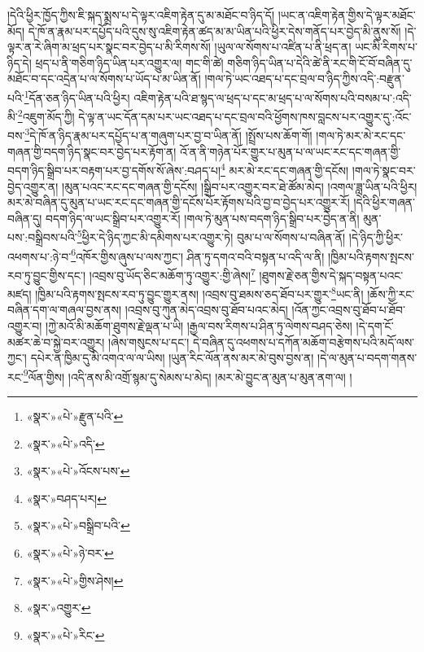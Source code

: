 །དེའི་ཕྱིར་ཁྱོད་ཀྱིས་ཇི་སྐད་སྨྲས་པ་དེ་ལྟར་འཇིག་རྟེན་དུ་མ་མཐོང་བ་ཉིད་དོ། །ཡང་ན་འཇིག་རྟེན་གྱིས་དེ་ལྟར་མཐོང་མོད། དེ་ཁོ་ན་རྣམ་པར་དཔྱོད་པའི་དུས་སུ་འཇིག་རྟེན་ཚད་མ་མ་ཡིན་པའི་ཕྱིར་དེས་གནོད་པར་བྱེད་མི་ནུས་སོ། །དེ་ལྟར་ན་རེ་ཞིག་མ་ཕྲད་པར་སྣང་བར་བྱེད་པ་མི་རིགས་སོ། །ཡུལ་ལ་སོགས་པ་འཛིན་པ་ནི་ཕྲད་ན། ཡང་མི་རིགས་པ་ཉིད་དེ། ཕྲད་པ་ནི་གཅིག་ཉིད་ཡིན་པར་འགྱུར་ལ། གང་གི་ཚེ། གཅིག་ཉིད་ཡིན་པ་དེའི་ཚེ་ནི་རང་གི་ངོ་བོ་བཞིན་དུ་མཐོང་བ་དང་འདྲེན་པ་ལ་སོགས་པ་ཡོད་པ་མ་ཡིན་ནོ། །གལ་ཏེ་ཡང་འཐད་པ་དང་བྲལ་བ་ཉིད་ཀྱིས་འདི་:བརྫུན་པའི་\footnote{«སྣར་»«པེ་»རྫུན་པའི་}དོན་ཅན་ཉིད་ཡིན་པའི་ཕྱིར། འཇིག་རྟེན་པའི་ཐ་སྙད་ལ་ཕྲད་པ་དང་མ་ཕྲད་པ་ལ་སོགས་པའི་བསམ་པ་:འདི་མི་\footnote{«སྣར་»«པེ་»འདི་}འཇུག་མོད་ཀྱི། དེ་ལྟ་ན་ཡང་དོན་དམ་པར་ཡང་འཐད་པ་དང་བྲལ་བའི་ཕྱོགས་ཁས་བླངས་པར་འགྱུར་དུ་:འོང་བས་\footnote{«སྣར་»«པེ་»འོངས་པས་}དེ་ཁོ་ན་ཉིད་རྣམ་པར་དཔྱོད་པ་ན་གཞུག་པར་བྱ་བ་ཡིན་ནོ། །སྤྲོས་པས་ཆོག་གོ། །གལ་ཏེ་མར་མེ་རང་དང་གཞན་གྱི་བདག་ཉིད་སྣང་བར་བྱེད་པར་རྟོག་ན། འོ་ན་ནི་གཉེན་པོར་གྱུར་པ་མུན་པ་ལ་ཡང་རང་དང་གཞན་གྱི་བདག་ཉིད་སྒྲིབ་པར་བརྟག་པར་བྱ་དགོས་སོ་ཞེས་:བཤད་པ།\footnote{«སྣར་»བཤད་པར།} མར་མེ་རང་དང་གཞན་གྱི་དངོས། །གལ་ཏེ་སྣང་བར་བྱེད་འགྱུར་ན། །མུན་པའང་རང་དང་གཞན་གྱི་དངོས། །སྒྲིབ་པར་འགྱུར་བར་ཐེ་ཚོམ་མེད། །འགལ་ཟླ་ཡིན་པའི་ཕྱིར། མར་མེ་བཞིན་དུ་མུན་པ་ཡང་རང་དང་གཞན་གྱི་དངོས་པོར་རྟོགས་པའི་བྱ་བ་བྱེད་པར་འགྱུར་རོ། །དེའི་ཕྱིར་གཞན་བཞིན་དུ། བདག་ཉིད་ལ་ཡང་སྒྲིབ་པར་འགྱུར་རོ། །གལ་ཏེ་མུན་པས་བདག་ཉིད་སྒྲིབ་པར་བྱེད་ན་ནི། མུན་པས་:བསྒྲིབས་པའི་\footnote{«སྣར་»«པེ་»བསྒྲིབ་པའི་}ཕྱིར་དེ་ཉིད་ཀྱང་མི་དམིགས་པར་འགྱུར་ཏེ། བུམ་པ་ལ་སོགས་པ་བཞིན་ནོ། །དེ་ཉིད་ཀྱི་ཕྱིར་འཕགས་པ་:ཉེ་བ་\footnote{«སྣར་»«པེ་»ཉེ་བར་}འཁོར་གྱིས་ཞུས་པ་ལས་ཀྱང་། ཤིན་ཏུ་དགའ་བའི་བསྟན་པ་འདི་ལ་ནི། །ཁྱིམ་པའི་རྟགས་སྤངས་རབ་ཏུ་བྱུང་གྱིས་དང་། །འབྲས་བུ་ཡོད་ཅིང་མཆོག་ཏུ་འགྱུར་:གྱི་ཞེས།\footnote{«སྣར་»«པེ་»གྱིས་ཤེས།} །ཐུགས་རྗེ་ཅན་གྱིས་དེ་སྐད་བསྟན་པའང་མཛད། །ཁྱིམ་པའི་རྟགས་སྤངས་རབ་ཏུ་བྱུང་གྱུར་ནས། །འབྲས་བུ་ཐམས་ཅད་ཐོབ་པར་གྱུར་\footnote{«སྣར་»འགྱུར་}ཡང་ནི། །ཆོས་ཀྱི་རང་བཞིན་དག་ལ་གཞལ་བྱས་ནས། །འབྲས་བུ་ཀུན་མེད་འབྲས་བུ་ཐོབ་པའང་མེད། །འོན་ཀྱང་འབྲས་བུ་ཐོབ་པ་ཐོབ་འགྱུར་བ། །ཀྱེ་མའོ་མི་མཆོག་ཐུགས་རྗེ་ལྡན་པ་ཡི། །རྒྱལ་བས་རིགས་པ་ཤིན་ཏུ་ལེགས་བཤད་ཅེས། །དེ་དག་ངོ་མཚར་ཆེ་བ་སྐྱེ་བར་འགྱུར། །ཞེས་གསུངས་པ་དང་། དེ་བཞིན་དུ་འཕགས་པ་དཀོན་མཆོག་བརྩེགས་པའི་མདོ་ལས་ཀྱང་། དཔེར་ན་ཁྱིམ་དུ་མི་འགའ་ལ་ལ་ཡིས། །ཡུན་རིང་ལོན་ནས་མར་མེ་བུས་བྱས་ན། །དེ་ལ་མུན་པ་བདག་གནས་རང་\footnote{«སྣར་»«པེ་»རིང་}ལོན་གྱིས། །འདི་ནས་མི་འགྲོ་སྙམ་དུ་སེམས་པ་མེད། །མར་མེ་བྱུང་ན་མུན་པ་མུན་ནག་ལ། །
